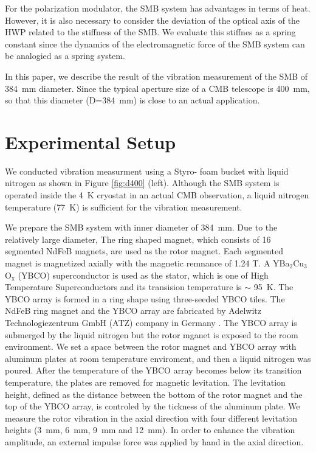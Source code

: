 \documentclass[a4paper]{jpconf}
\begin{document}
For the polarization modulator, the SMB system has advantages in terms of heat.
However, it is also necessary to consider the deviation of the optical axis of the HWP related to the stiffness of the SMB.
We evaluate this stiffnes as a spring constant since the dynamics of the electromagnetic force of the SMB system can be analogied as a spring system.

In this paper, we describe the result of the vibration measurement of the SMB of 384~mm diameter.
Since the typical aperture size of a CMB telescope is 400~mm, so that this diameter (D=384~mm) is close to an actual application.

\section*{Experimental Setup}


We conducted vibration measurment using a Styro- foam bucket with liquid nitrogen as shown in Figure \ref{fig:d400} (left).
Although the SMB system is operated inside the 4~K cryostat in an actual CMB observation, a liquid nitrogen temperature (77~K) is sufficient for the vibration measurement.

We prepare the SMB system with inner diameter of 384~mm.
Due to the relatively large diameter, The ring shaped magnet, which consists of 16 segmented NdFeB magnets, are used as the rotor magnet.
Each segmented magnet is magnetized axially with the magnetic remnance of 1.24 T.
A YBa$_{2}$Cu$_{3}$O$_{\mathrm{x}}$ (YBCO) superconductor is used as the stator, which is one of High Temperature Superconductors and its transision temperature is $\sim$ 95~K.
The YBCO array is formed in a ring shape using three-seeded YBCO tiles.
The NdFeB ring magnet and the YBCO array are fabricated by Adelwitz Technologiezentrum GmbH (ATZ) company in Germany \cite{ATZ}.
The YBCO array is submerged by the liquid nitrogen but the rotor mganet is exposed to the room environment.
We set a space between the rotor magnet and YBCO array with aluminum plates at room temperature enviroment, and then a liquid nitrogen was poured.
After the temperature of the YBCO array becomes below its transition temperature, the plates are removed for magnetic levitation.
The levitation height, defined as the distance between the bottom of the rotor magnet and the top of the YBCO array, is controled by the tickness of the aluminum plate.
We measure the rotor vibration in the axial direction with four different levitation heights (3~mm, 6~mm, 9~mm and 12~mm).
In order to enhance the vibration amplitude, an external impulse force was applied by hand in the axial direction.
\end{document}

